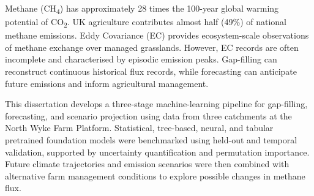 

Methane (CH\textsubscript{4}) has approximately 28 times the 100-year global warming
potential of CO\textsubscript{2}. UK agriculture contributes almost half (49\%) of 
national methane emissions. Eddy 
Covariance (EC) provides ecosystem-scale observations of methane exchange over managed 
grasslands. 
However, EC records are often incomplete and characterised by episodic emission peaks. 
Gap-filling can reconstruct continuous historical flux records, while forecasting can 
anticipate future emissions and inform agricultural management.

This dissertation develops a three-stage machine-learning pipeline for
gap-filling, forecasting, and scenario projection using data from three
catchments at the North Wyke Farm Platform. Statistical, tree-based, neural,
and tabular pretrained foundation models were benchmarked using held-out and temporal
validation, supported by uncertainty quantification and permutation
importance. Future climate trajectories and emission scenarios were then combined with  
alternative farm management conditions to explore possible changes in methane flux.


